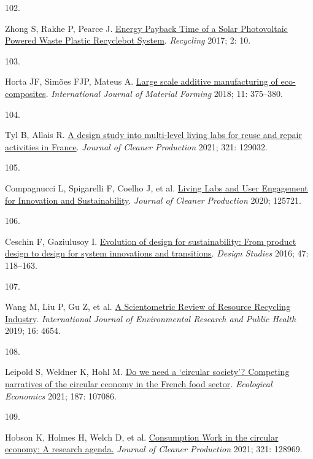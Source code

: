\documentclass[
  12pt,
  a4paperpaper,
  onecolumn]{article}
\newlength{\cslhangindent}
\newlength{\csllabelwidth}
\newlength{\cslentryspacingunit} %
\newenvironment{CSLReferences}[2] %
 {%
  \setlength{\parindent}{0pt}
  \ifodd #1
  \let\oldpar\par
  \def\par{\hangindent=\cslhangindent\oldpar}
  \fi
  \setlength{\parskip}{#2\cslentryspacingunit}
 }%
 {}
\newcommand{\CSLLeftMargin}[1]{\parbox[t]{\csllabelwidth}{#1}}
\newcommand{\CSLRightInline}[1]{\parbox[t]{\linewidth - \csllabelwidth}{#1}\break}
\begin{document}
\begin{CSLReferences}{0}{0}
\leavevmode{}%
\CSLLeftMargin{102. }%
\CSLRightInline{Zhong S, Rakhe P, Pearce J.
\href{https://doi.org/10.3390/recycling2020010}{Energy {Payback Time} of
a {Solar Photovoltaic Powered Waste Plastic Recyclebot System}}.
\emph{Recycling} 2017; 2: 10.}

\leavevmode{}%
\CSLLeftMargin{103. }%
\CSLRightInline{Horta JF, Simões FJP, Mateus A.
\href{https://doi.org/10.1007/s12289-017-1364-5}{Large scale additive
manufacturing of eco-composites}. \emph{International Journal of
Material Forming} 2018; 11: 375--380.}

\leavevmode{}%
\CSLLeftMargin{104. }%
\CSLRightInline{Tyl B, Allais R.
\href{https://doi.org/10.1016/J.JCLEPRO.2021.129032}{A design study into
multi-level living labs for reuse and repair activities in {France}}.
\emph{Journal of Cleaner Production} 2021; 321: 129032.}

\leavevmode{}%
\CSLLeftMargin{105. }%
\CSLRightInline{Compagnucci L, Spigarelli F, Coelho J, et al.
\href{https://doi.org/10.1016/j.jclepro.2020.125721}{Living {Labs} and
{User Engagement} for {Innovation} and {Sustainability}}. \emph{Journal
of Cleaner Production} 2020; 125721.}

\leavevmode{}%
\CSLLeftMargin{106. }%
\CSLRightInline{Ceschin F, Gaziulusoy I.
\href{https://doi.org/10.1016/j.destud.2016.09.002}{Evolution of design
for sustainability: {From} product design to design for system
innovations and transitions}. \emph{Design Studies} 2016; 47: 118--163.}

\leavevmode{}%
\CSLLeftMargin{107. }%
\CSLRightInline{Wang M, Liu P, Gu Z, et al.
\href{https://doi.org/10.3390/ijerph16234654}{A {Scientometric Review}
of {Resource Recycling Industry}}. \emph{International Journal of
Environmental Research and Public Health} 2019; 16: 4654.}

\leavevmode{}%
\CSLLeftMargin{108. }%
\CSLRightInline{Leipold S, Weldner K, Hohl M.
\href{https://doi.org/10.1016/j.ecolecon.2021.107086}{Do we need a
{`circular society'}? {Competing} narratives of the circular economy in
the {French} food sector}. \emph{Ecological Economics} 2021; 187:
107086.}

\leavevmode{}%
\CSLLeftMargin{109. }%
\CSLRightInline{Hobson K, Holmes H, Welch D, et al.
\href{https://doi.org/10.1016/J.JCLEPRO.2021.128969}{Consumption {Work}
in the circular economy: {A} research agenda.} \emph{Journal of Cleaner
Production} 2021; 321: 128969.}


\end{CSLReferences}
\end{document}
